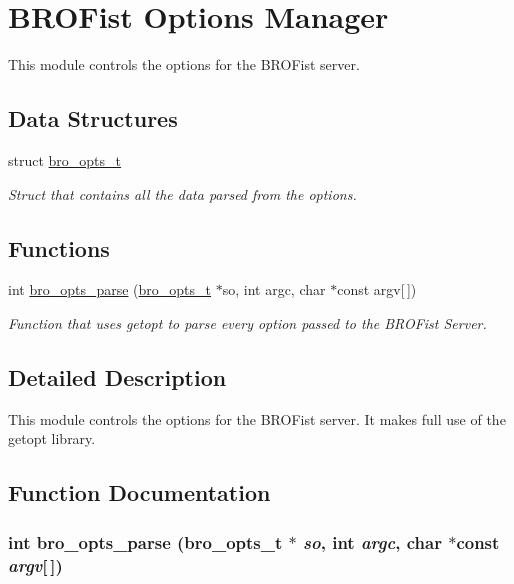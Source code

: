 \hypertarget{group___b_r_o_opts}{
\section{BROFist Options Manager}
\label{group___b_r_o_opts}
}


This module controls the options for the BROFist server.  


\subsection*{Data Structures}
\begin{DoxyCompactItemize}
\item 
struct \hyperlink{structbro__opts__t}{bro\_\-opts\_\-t}
\begin{DoxyCompactList}\small\item\em Struct that contains all the data parsed from the options. \item\end{DoxyCompactList}\end{DoxyCompactItemize}
\subsection*{Functions}
\begin{DoxyCompactItemize}
\item 
int \hyperlink{group___b_r_o_opts_ga3b624c622d32ee21daaee3e33adbe003}{bro\_\-opts\_\-parse} (\hyperlink{structbro__opts__t}{bro\_\-opts\_\-t} $\ast$so, int argc, char $\ast$const argv\mbox{[}$\,$\mbox{]})
\begin{DoxyCompactList}\small\item\em Function that uses getopt to parse every option passed to the BROFist Server. \item\end{DoxyCompactList}\end{DoxyCompactItemize}


\subsection{Detailed Description}
This module controls the options for the BROFist server. It makes full use of the {\ttfamily getopt} library. 

\subsection{Function Documentation}
\hypertarget{group___b_r_o_opts_ga3b624c622d32ee21daaee3e33adbe003}{
\subsubsection[{bro\_\-opts\_\-parse}]{\setlength{\rightskip}{0pt plus 5cm}int bro\_\-opts\_\-parse ({\bf bro\_\-opts\_\-t} $\ast$ {\em so}, \/  int {\em argc}, \/  char $\ast$const  {\em argv}\mbox{[}$\,$\mbox{]})}}
\label{group___b_r_o_opts_ga3b624c622d32ee21daaee3e33adbe003}


